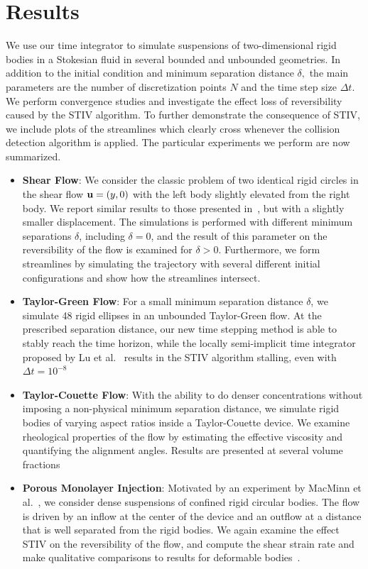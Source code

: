 \documentclass[preprint, 10pt]{elsarticle}
\begin{document}
\section{Results\label{s:results}} 
We use our time integrator to simulate suspensions of two-dimensional
rigid bodies in a Stokesian fluid in several bounded and unbounded
geometries.  In addition to the initial condition and minimum separation
distance $\delta,$ the main parameters are the number of discretization
points $N$ and the time step size $\Delta t$. We perform convergence
studies and investigate the effect loss of reversibility caused by the
STIV algorithm.  To further demonstrate the consequence of STIV, we
include plots of the streamlines which clearly cross whenever the
collision detection algorithm is applied.  The particular experiments we
perform are now summarized.
\begin{itemize}
  \item {\bf Shear Flow}: We consider the classic problem of two
  identical rigid circles in the shear flow ${\mathbf{u}} = (y,0)$ with the left
  body slightly elevated from the right body.  We report similar results
  to those presented in~\cite{Lu2017}, but with a slightly smaller
  displacement.  The simulations is performed with different minimum
  separations $\delta$, including $\delta=0$, and the result of this
  parameter on the reversibility of the flow is examined for $\delta >
  0$.  Furthermore, we form streamlines by simulating the trajectory
  with several different initial configurations and show how the
  streamlines intersect.

  \item {\bf Taylor-Green Flow}: For a small minimum separation distance
  $\delta$, we simulate 48 rigid ellipses in an unbounded Taylor-Green
  flow.  At the prescribed separation distance, our new time stepping
  method is able to stably reach the time horizon, while the locally
  semi-implicit time integrator proposed by Lu et al.~\cite{Lu2017}
  results in the STIV algorithm stalling, even with $\Delta t = 10^{-8}$

  \item {\bf Taylor-Couette Flow}: With the ability to do denser
  concentrations without imposing a non-physical minimum separation
  distance, we simulate rigid bodies of varying aspect ratios inside a
  Taylor-Couette device.  We examine rheological properties of the flow
  by estimating the effective viscosity and quantifying the alignment
  angles.  Results are presented at several volume fractions

  \item {\bf Porous Monolayer Injection}: Motivated by an experiment by
  MacMinn et al.~\cite{MacMinn2015}, we consider dense suspensions of
  confined rigid circular bodies.  The flow is driven by an inflow 
  at the center of the device and an outflow at a distance that is well
  separated from the rigid bodies.  We again examine the effect STIV on
  the reversibility of the flow, and compute the shear strain rate and
  make qualitative comparisons to results for deformable
  bodies~\cite{MacMinn2015}.
\end{itemize}
\end{document}
